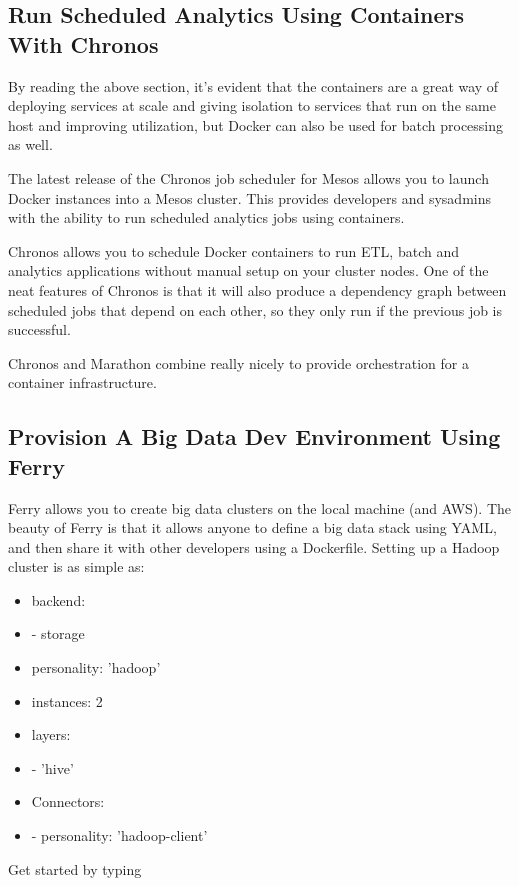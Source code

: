 \documentclass[sigconf]{acmart}
\begin{document}
	\subsection{Run Scheduled Analytics Using Containers With Chronos}
	By reading the above section, it's evident that the containers are a great way of deploying services at scale and giving isolation to services that run on the same host and improving utilization, but Docker can also be used for batch processing as well.
	
	The latest release of the Chronos job scheduler for Mesos allows you to launch Docker instances into a Mesos cluster. This provides developers and sysadmins with the ability to run scheduled analytics jobs using containers.\cite{Chronos}
	
	Chronos allows you to schedule Docker containers to run ETL, batch and analytics applications without manual setup on your cluster nodes. One of the neat features of Chronos is that it will also produce a dependency graph between scheduled jobs that depend on each other, so they only run if the previous job is successful.
	
	Chronos and Marathon combine really nicely to provide orchestration for a container infrastructure.
	
	\subsection{Provision A Big Data Dev Environment Using Ferry}
	Ferry allows you to create big data clusters on the local machine (and AWS). The beauty of Ferry is that it allows anyone to define a big data stack using YAML, and then share it with other developers using a Dockerfile.\cite{Ferry}
	Setting up a Hadoop cluster is as simple as:
	
	
	\begin{itemize}
		\item[]\noindent backend:
		\item[] - storage 
		\item[] personality: 'hadoop'
		\item[] instances: 2
		\item[] layers:
		\item[] - 'hive'
		\item[]\noindent Connectors: 
		\item[] - personality: 'hadoop-client'
	\end{itemize}	
	
	Get started by typing
	
\end{document}

